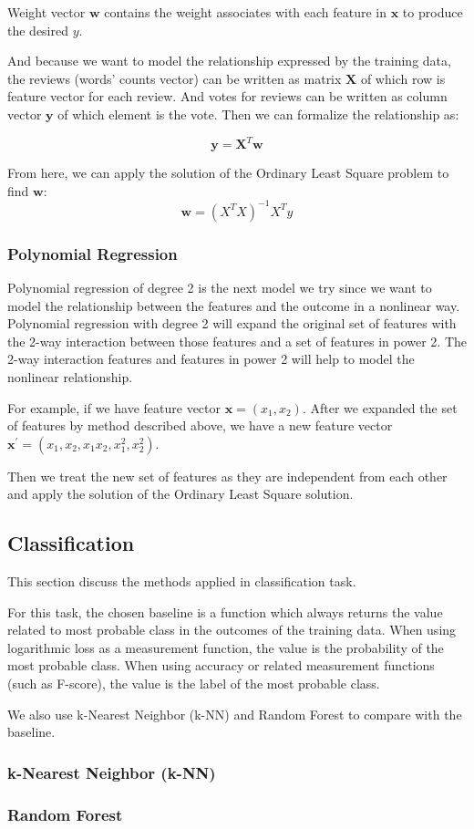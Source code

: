 Weight vector $\mathbf{w}$ contains the weight associates with each feature in $\mathbf{x}$ to produce the desired $y$.

And because we want to model the relationship expressed by the training data, the reviews (words' counts vector) can be written as matrix $\mathbf{X}$ of which row is feature vector for each review. And votes for reviews can be written as column vector $\mathbf{y}$ of which element is the vote. Then we can formalize the relationship as: 

\begin{equation*}
\mathbf{y} = \mathbf{X}^T\mathbf{w}
\end{equation*}

From here, we can apply the solution of the Ordinary Least Square problem to find $\mathbf{w}$:
\begin{equation*}
\mathbf{w} = (X^TX)^{-1}X^Ty
\end{equation*}

\subsubsection{Polynomial Regression}
Polynomial regression of degree 2 is the next model we try since we want to model the relationship between the  features and the outcome in a nonlinear way. Polynomial regression with degree 2 will expand the original set of features with the 2-way 
interaction between those features and a set of features in power 2. The 2-way interaction features and features in power 2 will help to model the nonlinear relationship.

For example, if we have feature vector $\mathbf{x} = (x_1, x_2)$. After we expanded the set of features by method described above, we have a new feature vector $\mathbf{x}^{'} = (x_1, x_2, x_1x_2, x_1^2, x_2^2)$.

Then we treat the new set of features as they are independent from each other and apply the solution of the Ordinary Least Square solution.

\subsection{Classification}
This section discuss the methods applied in classification task.

For this task, the chosen baseline is a function which always returns the value related to most probable class in the outcomes of the training data. When using logarithmic loss as a measurement function, the value is the probability of the most probable class. When using accuracy or related measurement functions (such as F-score), the value is the label of the most probable class.

We also use k-Nearest Neighbor (k-NN) and Random Forest to compare with the baseline.

\subsubsection{k-Nearest Neighbor (k-NN)}

\subsubsection{Random Forest}

